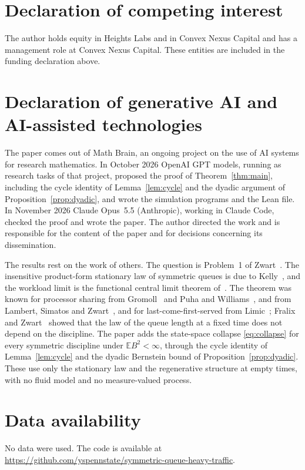 \documentclass[11pt]{amsart}
\theoremstyle{remark}
\numberwithin{equation}{section}
\newcommand{\E}{\mathbb E}
\newcommand{\1}{\mathbf 1}
\begin{document}
\section*{Declaration of competing interest}
The author holds equity in Heights Labs and in Convex Nexus Capital and
has a management role at Convex Nexus Capital. These entities are included
in the funding declaration above.

\section*{Declaration of generative AI and AI-assisted technologies}
The paper comes out of Math Brain, an ongoing project on the use of AI systems for research mathematics. In October 2026 OpenAI GPT models, running as research tasks of that project, proposed the proof of Theorem~\ref{thm:main}, including the cycle identity of Lemma~\ref{lem:cycle} and the dyadic argument of Proposition~\ref{prop:dyadic}, and wrote the simulation programs and the Lean file. In November 2026 Claude Opus~5.5 (Anthropic), working in Claude Code, checked the proof and wrote the paper. The author directed the work and is responsible for the content of the paper and for decisions concerning its dissemination.

The results rest on the work of others. The question is Problem~1 of Zwart~\cite{Zwa}. The insensitive product-form stationary law of symmetric queues is due to Kelly~\cite{Kel}, and the workload limit is the functional central limit theorem of~\cite{Whi}. The theorem was known for processor sharing from Gromoll~\cite{Gro} and Puha and Williams~\cite{PW}, and from Lambert, Simatos and Zwart~\cite{LSZ}, and for last-come-first-served from Limic~\cite{Lim}; Fralix and Zwart~\cite{FZ} showed that the law of the queue length at a fixed time does not depend on the discipline. The paper adds the state-space collapse \eqref{eq:collapse} for every symmetric discipline under $\E B^2<\infty$, through the cycle identity of Lemma~\ref{lem:cycle} and the dyadic Bernstein bound of Proposition~\ref{prop:dyadic}. These use only the stationary law and the regenerative structure at empty times, with no fluid model and no measure-valued process.

\section*{Data availability}
No data were used. The code is available at\\ \url{https://github.com/yspennstate/symmetric-queue-heavy-traffic}.
\end{document}
